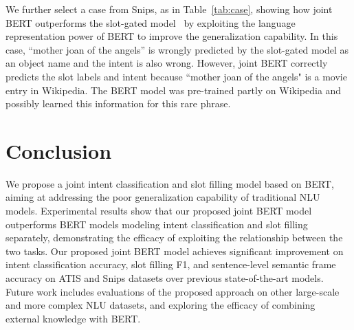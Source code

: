 \documentclass[11pt,a4paper]{article}
\begin{document}
We further select a case from Snips, as in Table~\ref{tab:case}, showing how joint BERT outperforms the slot-gated model~\cite{DBLP:conf/naacl/GooGHHCHC18} by exploiting the language representation power of BERT to improve the generalization capability. In this case, ``mother joan of the angels'' is wrongly predicted by the slot-gated model as an object name and the intent is also wrong. However, joint BERT correctly predicts the slot labels and intent because ``mother joan of the angels" is a movie entry in Wikipedia. The BERT model was pre-trained partly on Wikipedia and possibly learned this information for this rare phrase.

\section{Conclusion}
We propose a joint intent classification and slot filling model based on BERT, aiming at addressing the poor generalization capability of traditional NLU models. Experimental results show that our proposed joint BERT model outperforms BERT models modeling intent classification and slot filling separately, demonstrating the efficacy of exploiting the relationship between the two tasks. Our proposed joint BERT model achieves significant improvement on intent classification accuracy, slot filling F1, and sentence-level semantic frame accuracy on ATIS and Snips datasets over previous state-of-the-art models. Future work includes evaluations of the proposed approach on other large-scale and more complex NLU datasets, and exploring the efficacy of combining external knowledge with BERT.



\end{document}
